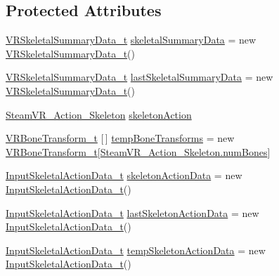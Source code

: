 \subsection*{Protected Attributes}
\begin{DoxyCompactItemize}
\item 
\mbox{\hyperlink{struct_valve_1_1_v_r_1_1_v_r_skeletal_summary_data__t}{V\+R\+Skeletal\+Summary\+Data\+\_\+t}} \mbox{\hyperlink{class_valve_1_1_v_r_1_1_steam_v_r___action___skeleton___source_a3b5bb5cca79e02c5864ca1025ebe7531}{skeletal\+Summary\+Data}} = new \mbox{\hyperlink{struct_valve_1_1_v_r_1_1_v_r_skeletal_summary_data__t}{V\+R\+Skeletal\+Summary\+Data\+\_\+t}}()
\item 
\mbox{\hyperlink{struct_valve_1_1_v_r_1_1_v_r_skeletal_summary_data__t}{V\+R\+Skeletal\+Summary\+Data\+\_\+t}} \mbox{\hyperlink{class_valve_1_1_v_r_1_1_steam_v_r___action___skeleton___source_a56cf3576253666dc4eaa5e9bca5b2936}{last\+Skeletal\+Summary\+Data}} = new \mbox{\hyperlink{struct_valve_1_1_v_r_1_1_v_r_skeletal_summary_data__t}{V\+R\+Skeletal\+Summary\+Data\+\_\+t}}()
\item 
\mbox{\hyperlink{class_valve_1_1_v_r_1_1_steam_v_r___action___skeleton}{Steam\+V\+R\+\_\+\+Action\+\_\+\+Skeleton}} \mbox{\hyperlink{class_valve_1_1_v_r_1_1_steam_v_r___action___skeleton___source_a6c6d0f535d4caebf144e346f6af38091}{skeleton\+Action}}
\item 
\mbox{\hyperlink{struct_valve_1_1_v_r_1_1_v_r_bone_transform__t}{V\+R\+Bone\+Transform\+\_\+t}} \mbox{[}$\,$\mbox{]} \mbox{\hyperlink{class_valve_1_1_v_r_1_1_steam_v_r___action___skeleton___source_a47b6f5f0ece31f09a0ef1a48fabf3f19}{temp\+Bone\+Transforms}} = new \mbox{\hyperlink{struct_valve_1_1_v_r_1_1_v_r_bone_transform__t}{V\+R\+Bone\+Transform\+\_\+t}}\mbox{[}\mbox{\hyperlink{class_valve_1_1_v_r_1_1_steam_v_r___action___skeleton_ab60abde1a0e0993a1a15c03554a5671a}{Steam\+V\+R\+\_\+\+Action\+\_\+\+Skeleton.\+num\+Bones}}\mbox{]}
\item 
\mbox{\hyperlink{struct_valve_1_1_v_r_1_1_input_skeletal_action_data__t}{Input\+Skeletal\+Action\+Data\+\_\+t}} \mbox{\hyperlink{class_valve_1_1_v_r_1_1_steam_v_r___action___skeleton___source_a3819cfb006a8663e4c4234c0d5fac34d}{skeleton\+Action\+Data}} = new \mbox{\hyperlink{struct_valve_1_1_v_r_1_1_input_skeletal_action_data__t}{Input\+Skeletal\+Action\+Data\+\_\+t}}()
\item 
\mbox{\hyperlink{struct_valve_1_1_v_r_1_1_input_skeletal_action_data__t}{Input\+Skeletal\+Action\+Data\+\_\+t}} \mbox{\hyperlink{class_valve_1_1_v_r_1_1_steam_v_r___action___skeleton___source_a45e152296782a90488385f9e857432b1}{last\+Skeleton\+Action\+Data}} = new \mbox{\hyperlink{struct_valve_1_1_v_r_1_1_input_skeletal_action_data__t}{Input\+Skeletal\+Action\+Data\+\_\+t}}()
\item 
\mbox{\hyperlink{struct_valve_1_1_v_r_1_1_input_skeletal_action_data__t}{Input\+Skeletal\+Action\+Data\+\_\+t}} \mbox{\hyperlink{class_valve_1_1_v_r_1_1_steam_v_r___action___skeleton___source_a37da7c1ece93c395dc6063eb74efccc8}{temp\+Skeleton\+Action\+Data}} = new \mbox{\hyperlink{struct_valve_1_1_v_r_1_1_input_skeletal_action_data__t}{Input\+Skeletal\+Action\+Data\+\_\+t}}()
\end{DoxyCompactItemize}
